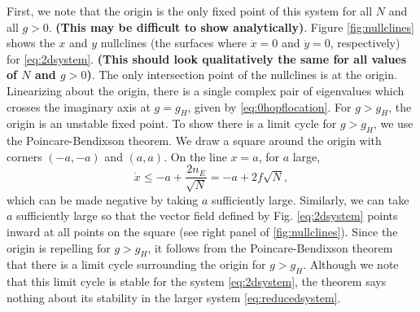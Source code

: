 \documentclass[11pt,reqno]{amsart}
\begin{document}
First, we note that the origin is the only fixed point of this system for all $N$ and all $g > 0$. \textbf{(This may be difficult to show analytically)}.  Figure \ref{fig:nullclines} shows the $x$ and $y$ nullclines (the surfaces where $\dot{x} = 0$ and $\dot{y} = 0$, respectively) for \cref{eq:2dsystem}. \textbf{(This should look qualitatively the same for all values of $N$ and $g > 0$)}. 
The only intersection point of the nullclines is at the origin. Linearizing about the origin, there is a single complex pair of eigenvalues which crosses the imaginary axis at $g = g_H$, given by \cref{eq:0hopflocation}. For $g > g_H$, the origin is an unstable fixed point. To show there is a limit cycle for $g > g_H$, we use the Poincare-Bendixson theorem. We draw a square around the origin with corners $(-a, -a)$ and $(a, a)$. On the line $x = a$, for $a$ large, 
\[
\dot{x} \leq -a + \frac{2 n_E}{\sqrt{N}} = -a + 2 f \sqrt{N},
\]
which can be made negative by taking $a$ sufficiently large. Similarly, we can take $a$ sufficiently large so that the vector field defined by Fig. \ref{eq:2dsystem} points inward at all points on the square (see right panel of \cref{fig:nullclines}). Since the origin is repelling for $g > g_H$, it follows from the Poincare-Bendixson theorem that there is a limit cycle surrounding the origin for $g > g_H$. Although we note that this limit cycle is stable for the system \cref{eq:2dsystem}, the theorem says nothing about its stability in the larger system \cref{eq:reducedsystem}.
\end{document}
